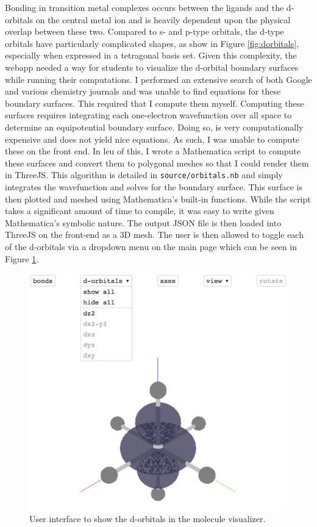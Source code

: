\documentclass[10pt,twocolumn]{article}
\begin{document}
Bonding in transition metal complexes occurs between the ligands and the d-orbitals on the central metal ion and is heavily dependent upon the physical overlap between these two. Compared to s- and p-type orbitals, the d-type orbitals have particularly complicated shapes, as show in Figure \ref{fig:dorbitals}, especially when expressed in a tetragonal basis set. Given this complexity, the webapp needed a way for students to visualize the d-orbital boundary surfaces while running their computations. I performed an extensive search of both Google and various chemistry journals and was unable to find equations for these boundary surfaces. This required that I compute them myself. Computing these surfaces requires integrating each one-electron wavefunction over all space to determine an equipotential boundary surface. Doing so, is very computationally expensive and does not yield nice equations. As such, I was unable to compute these on the front end. In leu of this, I wrote a Mathematica script to compute these surfaces and convert them to polygonal meshes so that I could render them in ThreeJS. This algorithm is detailed in \texttt{source/orbitals.nb} and simply integrates the wavefunction and solves for the boundary surface. This surface is then plotted and meshed using Mathematica’s built-in functions. While the script takes a significant amount of time to compile, it was easy to write given Mathematica’s symbolic nature. The output JSON file is then loaded into ThreeJS on the front-end as a 3D mesh. The user is then allowed to toggle each of the d-orbitals via a dropdown menu on the main page which can be seen in Figure \ref{fig:dorbitals-visualizer}.

\begin{figure}
	\centering
	\includegraphics[width=.95\linewidth]{dorbitalsvisualizer.png}
	\caption{
		User interface to show the d-orbitals in the molecule visualizer.
	}
	\label{fig:dorbitals-visualizer}
\end{figure}
\end{document}
